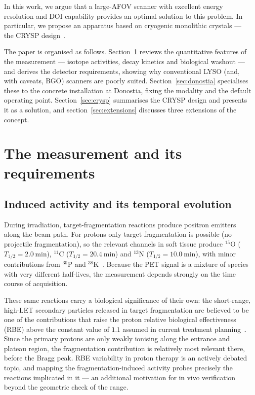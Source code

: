 \documentclass{iopjournal}
\begin{document}
 In this work, we argue that a  large-AFOV scanner with
excellent energy resolution and DOI capability provides an optimal solution to this problem. In particular, we propose an apparatus
based on cryogenic monolithic  crystals --- the CRYSP design~\cite{Soleti:2024flw}. 

The paper is organised as follows. Section~\ref{sec:requirements} reviews the
quantitative features of the measurement --- isotope activities, decay
kinetics and biological washout --- and derives the detector requirements,
showing why conventional LYSO (and, with caveats, BGO) scanners are poorly
suited. Section~\ref{sec:donostia} specialises these to the concrete
installation at Donostia, fixing the modality and the default operating point.
Section~\ref{sec:crysp} summarises the CRYSP design and presents it as a
solution, and section~\ref{sec:extensions} discusses three extensions of the
concept.

\section{The measurement and its requirements}
\label{sec:requirements}

\subsection{Induced activity and its temporal evolution}

During irradiation, target-fragmentation reactions produce positron emitters
along the beam path. For protons only target fragmentation is possible (no
projectile fragmentation), so the relevant channels in soft tissue produce
$^{15}$O ($T_{1/2}=\SI{2.0}{\minute}$), $^{11}$C ($T_{1/2}=\SI{20.4}{\minute}$)
and $^{13}$N ($T_{1/2}=\SI{10.0}{\minute}$), with minor contributions from
$^{30}$P and $^{38}$K~\cite{zhu2013proton}. Because the PET signal is a
mixture of species with very different half-lives, the measurement depends
strongly on the time course of acquisition.

These same reactions carry a biological significance of their own: the
short-range, high-LET secondary particles released in target fragmentation are
believed to be one of the contributions that raise the proton relative
biological effectiveness (RBE) above the constant value of $1.1$ assumed in
current treatment planning~\cite{paganetti2014relative}. Since the primary
protons are only weakly ionising along the entrance and plateau region, the
fragmentation contribution is relatively most relevant there, before the Bragg
peak. RBE variability in proton therapy is an actively debated topic, and
mapping the fragmentation-induced activity probes precisely the reactions
implicated in it --- an additional motivation for in vivo verification beyond
the geometric check of the range.
\end{document}
